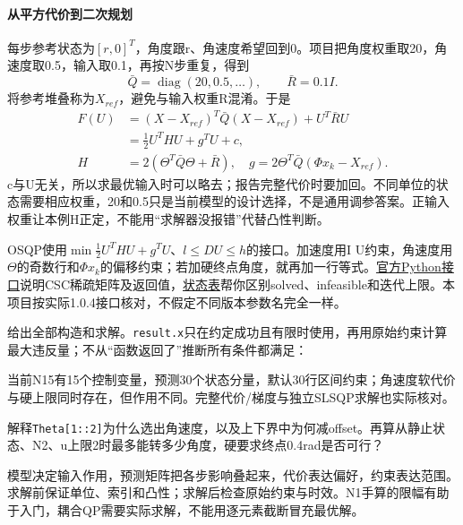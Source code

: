 \paragraph*{从平方代价到二次规划}
每步参考状态为$[r,0]^T$，角度跟r、角速度希望回到0。项目把角度权重取20，角速度取0.5，输入取0.1，再按N步重复，得到
\[
\bar Q=\operatorname{diag}(20,0.5,\ldots),\qquad \bar R=0.1I.
\]
将参考堆叠称为$X_{ref}$，避免与输入权重R混淆。于是
\begin{align*}
F(U)&=(X-X_{ref})^T\bar Q(X-X_{ref})+U^T\bar R U\\
&=\tfrac12U^THU+g^TU+c,\\
H&=2(\Theta^T\bar Q\Theta+\bar R),\quad
 g=2\Theta^T\bar Q(\Phi x_k-X_{ref}).
\end{align*}
c与U无关，所以求最优输入时可以略去；报告完整代价时要加回。不同单位的状态需要相应权重，20和0.5只是当前模型的设计选择，不是通用调参答案。正输入权重让本例H正定，不能用“求解器没报错”代替凸性判断。

OSQP使用$\min\frac12U^THU+g^TU$、$l\le DU\le h$的接口。加速度用I U约束，角速度用$\Theta$的奇数行和$\Phi x_k$的偏移约束；若加硬终点角度，就再加一行等式。\href{https://osqp.org/docs/interfaces/python.html}{官方Python接口}说明CSC稀疏矩阵及返回值，\href{https://osqp.org/docs/interfaces/status_values.html}{状态表}帮你区别solved、infeasible和迭代上限。本项目按实际1.0.4接口核对，不假定不同版本参数名完全一样。
\begin{example}[真正把约束交给求解器]
给出全部构造和求解。\texttt{result.x}只在约定成功且有限时使用，再用原始约束计算最大违反量；不从“函数返回了”推断所有条件都满足：

当前N15有15个控制变量，预测30个状态分量，默认30行区间约束；角速度软代价与硬上限同时存在，但作用不同。完整代价/梯度与独立SLSQP求解也实际核对。
\end{example}
\begin{exercise}\label{ex:v2-mpc-constraints}
解释\texttt{Theta[1::2]}为什么选出角速度，以及上下界中为何减offset。再算从静止状态、N2、u上限2时最多能转多少角度，硬要求终点0.4rad是否可行？
\end{exercise}
\begin{conclusion}
模型决定输入作用，预测矩阵把各步影响叠起来，代价表达偏好，约束表达范围。求解前保证单位、索引和凸性；求解后检查原始约束与时效。N1手算的限幅有助于入门，耦合QP需要实际求解，不能用逐元素截断冒充最优解。
\end{conclusion}

